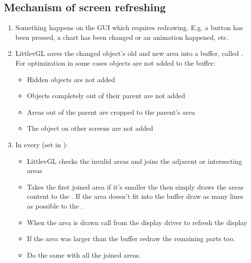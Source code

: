 \documentclass[letterpaper,10pt,english]{sphinxmanual}
\begin{document}
\subsection{Mechanism of screen refreshing}
\label{\detokenize{overview/drawing:mechanism-of-screen-refreshing}}\begin{enumerate}
\def\theenumi{\arabic{enumi}}
\def\labelenumi{\theenumi .}
\makeatletter\def\p@enumii{\p@enumi \theenumi .}\makeatother
\item {} 
Something happens on the GUI which requires redrawing. E.g. a button has been pressed, a chart has been changed or an animation happened, etc.

\item {} 
LittlevGL saves the changed object’s old and new area into a buffer, called . For optimization in some cases objects are not added to the buffer:
\begin{itemize}
\item {} 
Hidden objects are not added

\item {} 
Objects completely out of their parent are not added

\item {} 
Areas out of the parent are cropped to the parent’s area

\item {} 
The object on other screens are not added

\end{itemize}

\item {} 
In every  (set in ):
\begin{itemize}
\item {} 
LittlevGL checks the invalid areas and joins the adjacent or intersecting areas

\item {} 
Takes the first joined area if it’s smaller the  then simply draws the areas content to the . If the area doesn’t fit into the buffer draw as many lines as possible to the .

\item {} 
When the area is drawn call  from the display driver to refresh the display

\item {} 
If the area was larger than the buffer redraw the remaining parts too.

\item {} 
Do the same with all the joined areas.

\end{itemize}

\end{enumerate}
\end{document}
